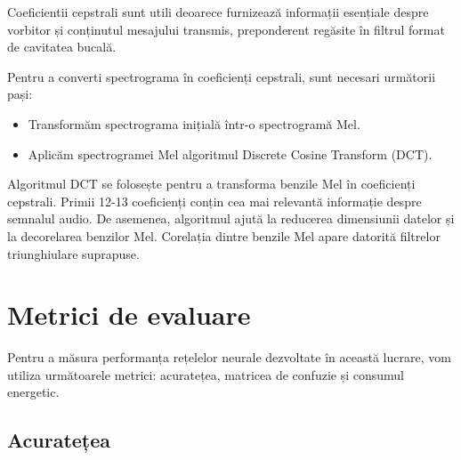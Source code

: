 Coeficientii cepstrali sunt utili deoarece furnizează informații esențiale despre vorbitor și conținutul mesajului transmis, preponderent regăsite în filtrul format de cavitatea bucală.




Pentru a converti spectrograma în coeficienți cepstrali, sunt necesari următorii pași:

\begin{itemize}
    \item Transformăm spectrograma inițială într-o spectrogramă Mel.
    \item Aplicăm spectrogramei Mel algoritmul Discrete Cosine Transform (DCT).
\end{itemize}

Algoritmul DCT se folosește pentru a transforma benzile Mel în coeficienți cepstrali. Primii 12-13 coeficienți conțin cea mai relevantă informație despre semnalul audio. De 
asemenea, algoritmul ajută la reducerea dimensiunii datelor și la decorelarea benzilor Mel. Corelația dintre benzile Mel apare datorită filtrelor triunghiulare suprapuse.


\section{Metrici de evaluare}

Pentru a măsura performanța rețelelor neurale dezvoltate în această lucrare, vom utiliza următoarele metrici: acuratețea, matricea de confuzie și consumul energetic.


\subsection{Acuratețea}

